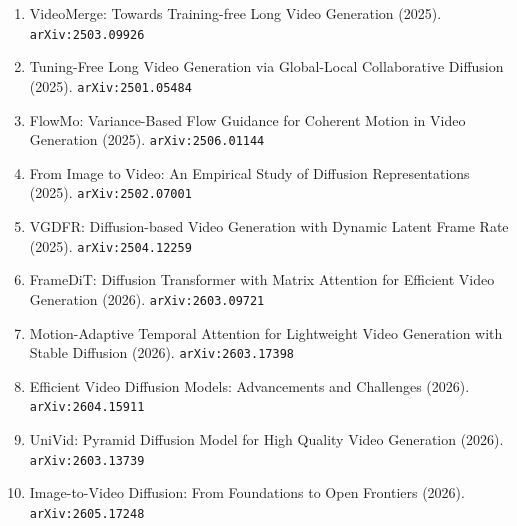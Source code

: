 \documentclass[11pt]{article}
\begin{document}
\begin{enumerate}
  \item VideoMerge: Towards Training-free Long Video Generation (2025). \texttt{arXiv:2503.09926}
  \item Tuning-Free Long Video Generation via Global-Local Collaborative
  Diffusion (2025). \texttt{arXiv:2501.05484}
  \item FlowMo: Variance-Based Flow Guidance for Coherent Motion in Video Generation (2025). \texttt{arXiv:2506.01144}
  \item From Image to Video: An Empirical Study of Diffusion Representations (2025). \texttt{arXiv:2502.07001}
  \item VGDFR: Diffusion-based Video Generation with Dynamic Latent Frame Rate (2025). \texttt{arXiv:2504.12259}
  \item FrameDiT: Diffusion Transformer with Matrix Attention for Efficient Video Generation (2026). \texttt{arXiv:2603.09721}
  \item Motion-Adaptive Temporal Attention for Lightweight Video Generation with Stable Diffusion (2026). \texttt{arXiv:2603.17398}
  \item Efficient Video Diffusion Models: Advancements and Challenges (2026). \texttt{arXiv:2604.15911}
  \item UniVid: Pyramid Diffusion Model for High Quality Video Generation (2026). \texttt{arXiv:2603.13739}
  \item Image-to-Video Diffusion: From Foundations to Open Frontiers (2026). \texttt{arXiv:2605.17248}
\end{enumerate}
\end{document}
